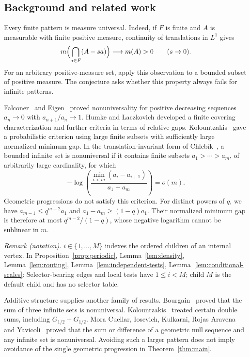 \subsection{Background and related work}

Every finite pattern is measure universal. Indeed, if $F$ is finite
and $A$ is measurable with finite positive measure, continuity of
translations in $L^1$ gives
\[
 m\Bigl(\bigcap_{a\in F}(A-sa)\Bigr)\longrightarrow m(A)>0
 \qquad(s\to0).
\]
For an arbitrary positive-measure set, apply this observation to a
bounded subset of positive measure. The conjecture asks whether this
property always fails for infinite patterns.

Falconer~\cite{Falconer1984} and Eigen~\cite{Eigen1985} proved
nonuniversality for positive decreasing sequences $a_n\to0$ with
$a_{n+1}/a_n\to1$. Humke and Laczkovich
\cite[Theorems~1--2 and Corollary~1]{HumkeLaczkovich1998} developed a
finite covering characterization and further criteria in terms of
relative gaps. Kolountzakis~\cite[Theorem~3]{Kolountzakis1997} gave
a probabilistic criterion using large finite subsets with sufficiently
large normalized minimum gap. In the translation-invariant form of
Chleb\'ik~\cite[Theorem~15]{Chlebik2015}, a bounded infinite set is
nonuniversal if it contains finite subsets $a_1>\cdots>a_m$, of
arbitrarily large cardinality, for which
\[
 -\log\left(\frac{\min_{i<m}(a_i-a_{i+1})}{a_1-a_m}\right)=o(m).
\]
Geometric progressions do not satisfy this criterion. For distinct
powers of $q$, we have $a_{m-1}\le q^{m-2}a_1$ and
$a_1-a_m\ge(1-q)a_1$. Their normalized minimum gap is therefore at
most $q^{m-2}/(1-q)$, whose negative logarithm cannot be sublinear
in $m$.

\noindent\textit{Remark (notation).} $i\in\{1,\ldots,M\}$ indexes the ordered children of an internal vertex. In Proposition~\ref{prop:periodic}, Lemma~\ref{lem:density}, Lemma~\ref{lem:routing}, Lemma~\ref{lem:independent-tests}, Lemma~\ref{lem:conditional-scales}: Selector-bearing edges and local tests have $1\le i<M$; child $M$ is the default child and has no selector table.


Additive structure supplies another family of results.
Bourgain~\cite{Bourgain1987} proved that the sum of three infinite
sets is nonuniversal. Kolountzakis~\cite{Kolountzakis1997} treated
certain double sums, including $G_{1/2}+G_{1/2}$.
Mora Cuellar, Iosevich, Kulkarni, Rojas Aravena and
Yavicoli~\cite[Theorem~2]{MoraCuellarEtAl2026Twofold} proved that the
sum or difference of a geometric null sequence and any infinite set
is nonuniversal. Avoiding such a larger pattern does not imply
avoidance of the single geometric progression in Theorem~\ref{thm:main}.


